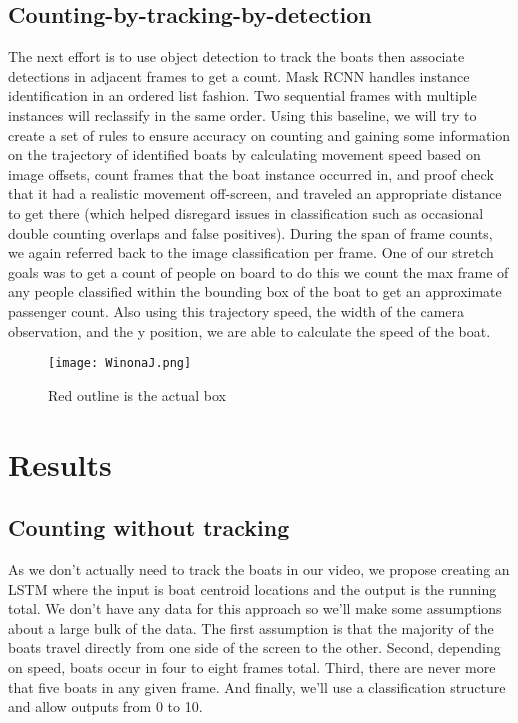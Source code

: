 \documentclass[10pt,twocolumn,letterpaper]{article}
\begin{document}
\subsection{Counting-by-tracking-by-detection}

The next effort is to use object detection to track the boats then associate detections in adjacent frames to get a count. Mask RCNN handles instance identification in an ordered list fashion.  Two sequential frames with multiple instances will reclassify in the same order.  Using this baseline, we will try to create a set of rules to ensure accuracy on counting and gaining some information on the trajectory of identified boats by calculating movement speed based on image offsets, count frames that the boat instance occurred in, and proof check that it had a realistic movement off-screen, and traveled an appropriate distance to get there (which helped disregard issues in classification such as occasional double counting overlaps and false positives).  During the span of frame counts, we again referred back to the image classification per frame. One of our stretch goals was to get a count of people on board to do this we count the max frame of any people classified within the bounding box of the boat to get an approximate passenger count. Also using this trajectory speed, the width of the camera observation, and the y position, we are able to calculate the speed of the boat. 

\begin{figure*}[t]
  \centering
    \texttt{[image: WinonaJ.png]}
    \caption{Red outline is the actual box}
    \label{fig:WinonaJ}
  \hfill
\end{figure*}
\section{Results} 
\subsection{Counting without tracking}

As we don't actually need to track the boats in our video, we propose creating an LSTM where the input is boat centroid locations and the output is the running total. We don't have any data for this approach so we'll make some assumptions about a large bulk of the data. The first assumption is that the majority of the boats travel directly from one side of the screen to the other. Second, depending on speed, boats occur in four to eight frames total. Third, there are never more that five boats in any given frame. And finally, we'll use a classification structure and allow outputs from 0 to 10. 
\end{document}
